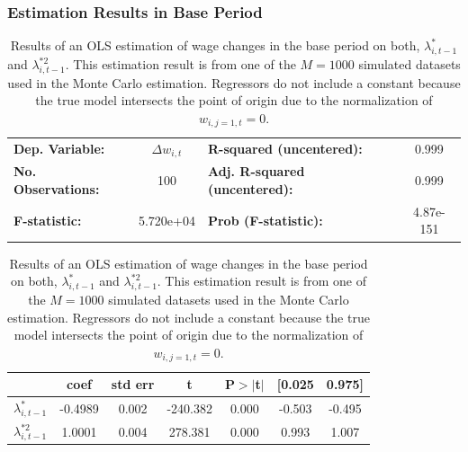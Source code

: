 \documentclass[../main.tex]{subfiles}
\begin{document}
\subsubsection{Estimation Results in Base Period}
\begin{table}[!htbp]
\begin{center}
\begin{tabular}{lclc}
\toprule
\textbf{Dep. Variable:}    & $\Delta w_{i,t}$ & \textbf{  R-squared (uncentered):}      &     0.999   \\
\textbf{No. Observations:} &       100        & \textbf{  Adj. R-squared (uncentered):} &     0.999   \\
\textbf{F-statistic:}      &  5.720e+04      & \textbf{  Prob (F-statistic):}          & 4.87e-151   \\
\bottomrule
\end{tabular}
\begin{tabular}{lcccccc}
                  & \textbf{coef} & \textbf{std err} & \textbf{t} & \textbf{P$> |$t$|$} & \textbf{[0.025} & \textbf{0.975]}  \\
\midrule
\textbf{$\lambda_{i, t-1}^{*}$}   &       -0.4989  &        0.002     &   -240.382  &         0.000        &        -0.503    &        -0.495     \\
\textbf{$\lambda_{i, t-1}^{*2}$} &        1.0001  &        0.004     &    278.381  &         0.000        &         0.993   &         1.007    \\
\bottomrule
\end{tabular}

\end{center}
\caption{Results of an OLS estimation of wage changes in the base period on both, $\lambda_{i, t-1}^{*}$ and $\lambda_{i, t-1}^{*2}$. This estimation result is from one of the $M = 1000$ simulated datasets used in the Monte Carlo estimation. Regressors do not include a constant because the true model intersects the point of origin due to the normalization of $w_{i,j=1,t} = 0$.}
\label{tab:base_period_regression_rlst_t-1}
\end{table}
\end{document}
